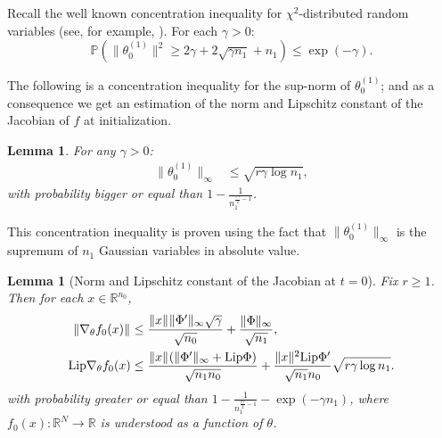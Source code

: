 \documentclass{article}
\newtheorem{lem}[thm]{Lemma}
\theoremstyle{definition}
\theoremstyle{remark}
\numberwithin{equation}{section}
\newcommand{\R}{\mathbb{R}}
\newcommand{\norm}[2]{
    \|#1\|_{#2}
}
\begin{document}
Recall the well known concentration inequality for $\chi^2$-distributed random variables (see, for example, \cite{laurentmassart}).
    For each $\gamma > 0$:
    \begin{equation}
        \label{eqmassart_laurent}
        \mathbb P (\norm{\theta_0^{(1)}}{}^2 \ge 2\gamma + 2 \sqrt{ \gamma n_1 }+ n_1) \le \exp(-\gamma). 
    \end{equation}

    The following is a concentration inequality for the sup-norm of $\theta_0^{(1)}$; 
    and as a consequence we get an estimation of the norm and Lipschitz constant of the Jacobian of $f$ at initialization.
\begin{lem}
    \label{lem:supnorm}
    For any $\gamma > 0$:
    \begin{align}
        \norm{\theta_0^{(1)}}{\infty} 
        &\le\sqrt{r\gamma \log n_1},
    \end{align}
    with probability bigger or equal than $1 - \frac{1}{n_1^{\frac{r\gamma}{2}-1}}$.
\end{lem}

This concentration inequality is proven using the fact that $\norm{\theta_0^{(1)}}{\infty}$ is the supremum of $n_1$ Gaussian variables in absolute value.

\begin{lem}[Norm and Lipschitz constant of the Jacobian at $t=0$]
    \label{lem:jacobian}
    Fix $r\ge 1$.
    Then for each $x \in \R^{n_0}$,
    \begin{align}
        \norm{\nabla_\theta f_0(x)}{} &\le \frac{\norm{x}{}\norm{\Phi'}{\infty}\sqrt{\gamma}}{\sqrt{n_0}} + \frac{\norm{\Phi}{\infty}}{\sqrt{n_1}},\\
        \textup{Lip}\nabla_\theta f_0(x) &\le \frac{\norm{x}{}(\norm{\Phi'}{\infty}+\textup{Lip}\Phi)}{\sqrt{n_1n_0}} + \frac{\norm{x}{}^2\textup{Lip}\Phi'}{\sqrt{n_1}n_0}\sqrt{r\gamma \log n_1}.
    \end{align}
    with probability greater or equal than $1 - \frac{1}{n_1^{\frac{r\gamma}{2}-1}}-\exp(-\gamma n_1)$, where $f_0(x) \colon \R^N \to \R$ is understood as a function of $\theta$.
\end{lem}
\end{document}
